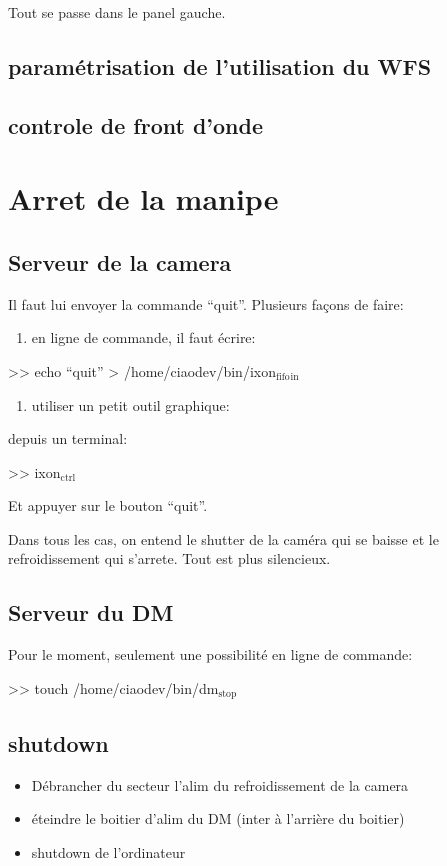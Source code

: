 \documentclass[11pt]{article}
\begin{document}
Tout se passe dans le panel gauche.
\subsection{paramétrisation de l'utilisation du WFS}
\label{sec-3-2}
\subsection{controle de front d'onde}
\label{sec-3-3}
\section{Arret de la manipe}
\label{sec-4}
\subsection{Serveur de la camera}
\label{sec-4-1}


Il faut lui envoyer la commande ``quit''. Plusieurs façons de faire:

\begin{enumerate}
\item en ligne de commande, il faut écrire:
\end{enumerate}

>> echo ``quit'' > /home/ciaodev/bin/ixon$_{\mathrm{fifo}}$$_{\mathrm{in}}$

\begin{enumerate}
\item utiliser un petit outil graphique:
\end{enumerate}

depuis un terminal:

>> ixon$_{\mathrm{ctrl}}$

Et appuyer sur le bouton ``quit''.

Dans tous les cas, on entend le shutter de la caméra qui se baisse et
le refroidissement qui s'arrete. Tout est plus silencieux.
\subsection{Serveur du DM}
\label{sec-4-2}


Pour le moment, seulement une possibilité en ligne de commande:

>> touch /home/ciaodev/bin/dm$_{\mathrm{stop}}$
\subsection{shutdown}
\label{sec-4-3}

\begin{itemize}
\item Débrancher du secteur l'alim du refroidissement de la camera
\item éteindre le boitier d'alim du DM (inter à l'arrière du boitier)
\item shutdown de l'ordinateur
\end{itemize}
\end{document}

